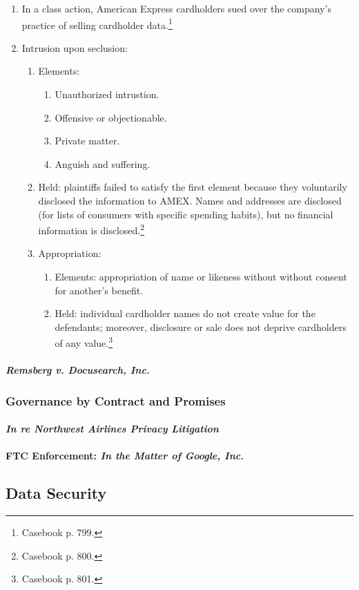 \begin{enumerate}
    \item In a class action, American Express cardholders sued over the 
    company's practice of selling cardholder data.\footnote{Casebook p. 799.}
    \item Intrusion upon seclusion:
    \begin{enumerate}
        \item Elements:
        \begin{enumerate}
            \item Unauthorized intrustion.
            \item Offensive or objectionable.
            \item Private matter.
            \item Anguish and suffering.
        \end{enumerate}
        \item Held: plaintiffs failed to satisfy the first element because they 
        voluntarily disclosed the information to AMEX. Names and addresses are 
        disclosed (for lists of consumers with specific spending habits), but no 
        financial information is disclosed.\footnote{Casebook p. 800.}
        \item Appropriation:
        \begin{enumerate}
            \item Elements: appropriation of name or likeness without without 
            consent for another's benefit.
            \item Held: individual cardholder names do not create value for the 
            defendants; moreover, disclosure or sale does not deprive 
            cardholders of any value.\footnote{Casebook p. 801.}
        \end{enumerate}
    \end{enumerate}
\end{enumerate}

\paragraph{\emph{Remsberg v. Docusearch, Inc.}}


\subsubsection{Governance by Contract and Promises}

\paragraph{\emph{In re Northwest Airlines Privacy Litigation}}


\paragraph{FTC Enforcement: \emph{In the Matter of Google, Inc.}}



\subsection{Data Security}

